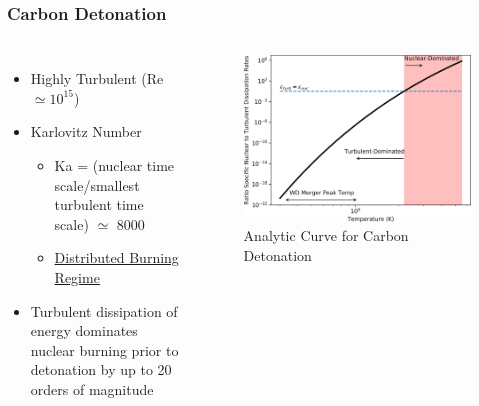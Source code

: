 \documentclass{beamer}
\begin{document}
\begin{frame}
\frametitle{Carbon Detonation}

\begin{columns}[c]
        \begin{itemize}
		\item Highly Turbulent (Re $\simeq 10^{15}$) 
                \item Karlovitz Number
			\begin{itemize}
				\item Ka = (nuclear time scale/smallest turbulent time scale) $\simeq$ 8000
				\item \underline{Distributed Burning Regime}
			\end{itemize}
		\item Turbulent dissipation of energy dominates nuclear burning prior to detonation by up to 20 orders of magnitude
        \end{itemize}


	\vspace{25pt}
        \begin{figure}
    \begin{center}
      \includegraphics[width=.90\linewidth]{carbon_enuc_ration.png}
            \caption{Analytic Curve for Carbon Detonation}
    \end{center}
  \end{figure}

        \end{columns}

\end{frame}



\end{document}
